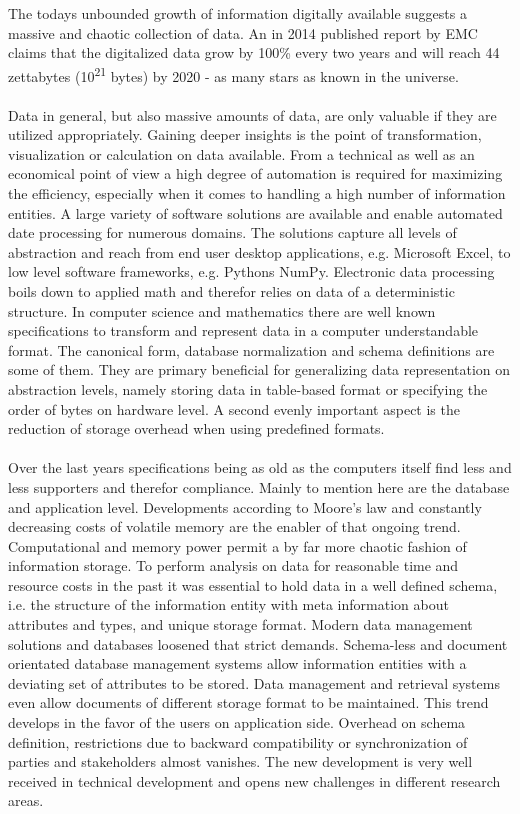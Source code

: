 The todays unbounded growth of information digitally available suggests a massive and chaotic collection of data. An in 2014 published report by EMC claims that the digitalized data grow by 100\% every two years and will reach 44 zettabytes (10\textsuperscript{21} bytes) by 2020 - as many stars as known in the universe. 
\\\\
Data in general, but also massive amounts of data, are only valuable if they are utilized appropriately. Gaining deeper insights is the point of transformation, visualization or calculation on data available. From a technical as well as an economical point of view a high degree of automation is required for maximizing the efficiency, especially when it comes to handling a high number of information entities. A large variety of software solutions are available and enable automated date processing for numerous domains. The solutions capture all levels of abstraction and reach from end user desktop applications, e.g. Microsoft Excel, to low level software frameworks, e.g. Pythons NumPy. Electronic data processing boils down to applied math and therefor relies on data of a deterministic structure. In computer science and mathematics there are well known specifications to transform and represent data in a computer understandable format. The canonical form, database normalization and schema definitions are some of them. They are primary beneficial for generalizing data representation on abstraction levels, namely storing data in table-based format or specifying the order of bytes on hardware level. A second evenly important aspect is the reduction of storage overhead when using predefined formats.
\\\\
Over the last years specifications being as old as the computers itself find less and less supporters and therefor compliance. Mainly to mention here are the database and application level. Developments according to Moore's law and constantly decreasing  costs of volatile memory are the enabler of that ongoing trend. Computational and memory power permit a by far more chaotic fashion of information storage. To perform analysis on data for reasonable time and resource costs in the past it was essential to hold data in a well defined schema, i.e. the structure of the information entity with meta information about attributes and types, and unique storage format. Modern data management solutions and databases loosened that strict demands. Schema-less and document orientated database management systems allow information entities with a deviating set of attributes to be stored. Data management and retrieval systems even allow documents of different storage format to be maintained. This trend develops in the favor of the users on application side. Overhead on schema definition, restrictions due to backward compatibility or synchronization of parties and stakeholders almost vanishes. The new development is very well received in technical development and opens new challenges in different research areas.
